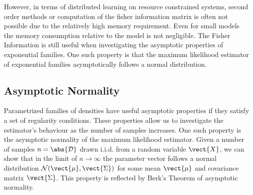     However, in terms of distributed learning on resource constrained systems, second order methods or computation of the fisher information matrix is often not possible due to the relatively high memory requirement.
    Even for small models the memory consumption relative to the model is not negligible.
    The Fisher Information is still useful when investigating the asymptotic properties of exponential families. 
    One such property is that the maximum likelihood estimator of exponential families asymptotically follows a normal distribution.

    \subsection{Asymptotic Normality}
        \label{ssec:asymp}
        Parametrized families of densities have useful asymptotic properties if they satisfy a set of regularity conditions.
        These properties allow us to investigate the estimator's behaviour as the number of samples increases. 
        One such property is the asymptotic normality of the maximum likelihood estimator.
        Given a number of samples $n = \abs{\mathcal{D}}$ drawn i.i.d. from a random variable $\vect{X}$, we can show that in the limit of $n \rightarrow \infty$ the parameter vector follows a normal distribution $\mathcal{N}(\vect{\mu}, \vect{\Sigma})$ for some mean $\vect{\mu}$ and covariance matrix $\vect{\Sigma}$. 
        This property is reflected by Berk's Theorem of asymptotic normality.



